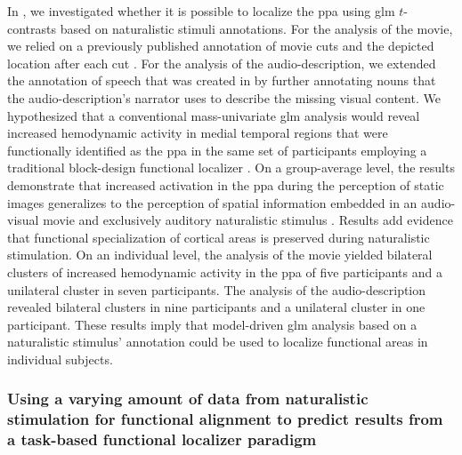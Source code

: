 

In \citet{haeusler2022processing}, we investigated whether it is possible to
localize the \ac{ppa} using \ac{glm} $t$-contrasts based on naturalistic stimuli
annotations.
For the analysis of the movie, we relied on a previously published annotation of
movie cuts and the depicted location after each cut \citep{haeusler2016cutanno}.
For the analysis of the audio-description, we extended the annotation of speech
that was created in \citet{haeusler2021speechanno} by further annotating nouns
that the audio-description's narrator uses to describe the missing visual
content.
We hypothesized that a conventional mass-univariate \ac{glm} analysis would
reveal increased hemodynamic activity in medial temporal regions that were
functionally identified as the \ac{ppa} in the same set of participants
employing a traditional block-design functional localizer
\citep{sengupta2016extension}.
On a group-average level, the results demonstrate that increased activation in
the \ac{ppa} during the perception of static images generalizes to the
perception of spatial information embedded in an audio-visual movie and
exclusively auditory naturalistic stimulus \citep{haeusler2022processing}.
Results add evidence \citep[cf.][]{bartels2004mapping} that functional
specialization of cortical areas is preserved during naturalistic stimulation.
On an individual level, the analysis of the movie yielded bilateral clusters of
increased hemodynamic activity in the \ac{ppa} of five participants and a
unilateral cluster in seven participants.
%
The analysis of the audio-description revealed bilateral clusters in nine
participants and a unilateral cluster in one participant.
%
These results imply that model-driven \ac{glm} analysis based on a naturalistic
stimulus' annotation could be used to localize functional areas in individual
subjects.


\subsubsection{Using a varying amount of data from naturalistic stimulation for
functional alignment to predict results from a task-based functional localizer
paradigm}

